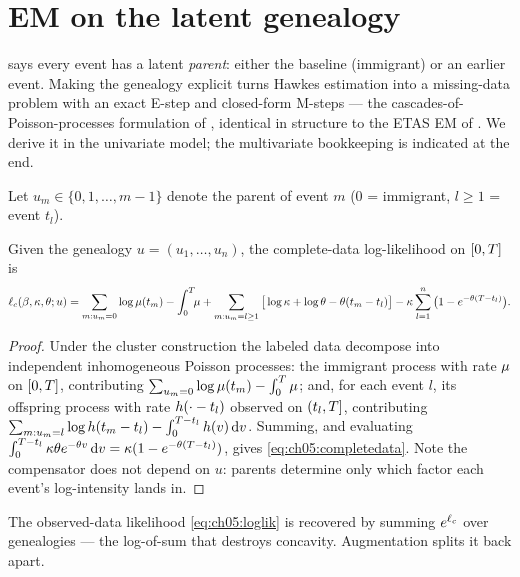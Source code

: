 \section{EM on the latent genealogy}\label{ch05:sec:em}

 says every event has a latent \emph{parent}:
either the baseline (immigrant) or an earlier event. Making the genealogy
explicit turns Hawkes estimation into a missing-data problem with an exact
E-step and closed-form M-steps --- the cascades-of-Poisson-processes
formulation of \citet{simmajordan2010}, identical in structure to the ETAS
EM of \citet{veenschoenberg2008}. We derive it in the univariate model;
the multivariate bookkeeping is indicated at the end.

Let $u_m \in \{0, 1, \dots, m-1\}$ denote the parent of event $m$ ($0$ =
immigrant, $l \ge 1$ = event $t_l$).

\begin{lemma}\label{lem:ch05:completedata}
Given the genealogy $u = (u_1,\dots,u_n)$, the complete-data
log-likelihood on $[0,T]$ is
\begin{equation}\label{eq:ch05:completedata}
\ell_c(\beta,\kappa,\theta; u)
=
\sum_{m: u_m = 0} \log \mu(t_m)
- \int_0^{T}\!\! \mu
+ \sum_{m: u_m = l \ge 1}
\big[\log\kappa + \log\theta - \theta(t_m - t_l)\big]
- \kappa \sum_{l=1}^{n} \big(1 - e^{-\theta(T - t_l)}\big).
\end{equation}
\end{lemma}

\begin{proof}
Under the cluster construction the labeled data decompose into
independent inhomogeneous Poisson processes: the immigrant process with
rate $\mu$ on $[0,T]$, contributing $\sum_{u_m=0}\log\mu(t_m) -
\int_0^{T}\mu$; and, for each event $l$, its offspring process with
rate $h(\cdot - t_l)$ observed on $(t_l, T]$, contributing
$\sum_{m: u_m=l}\log h(t_m-t_l) - \int_0^{T - t_l}h(v)\,\mathrm{d} v$.
Summing, and evaluating $\int_0^{T-t_l}\kappa\theta e^{-\theta v}\,\mathrm{d}
v = \kappa(1-e^{-\theta(T-t_l)})$, gives
\cref{eq:ch05:completedata}. Note the compensator does not depend on $u$:
parents determine only which factor each event's log-intensity lands in.
\end{proof}

The observed-data likelihood \cref{eq:ch05:loglik} is recovered by summing
$e^{\ell_c}$ over genealogies --- the log-of-sum that destroys
concavity. Augmentation splits it back apart.

